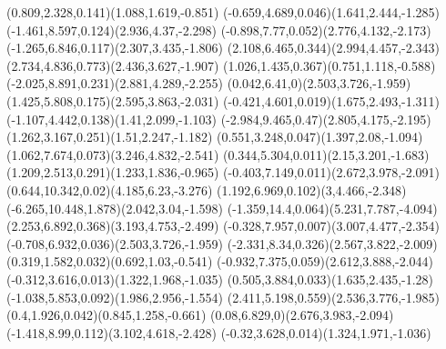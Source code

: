 \pstThreeDLine[linecolor=gray](0.809,2.328,0.141)(1.088,1.619,-0.851)
\pstThreeDLine[linecolor=gray](-0.659,4.689,0.046)(1.641,2.444,-1.285)
\pstThreeDLine[linecolor=gray](-1.461,8.597,0.124)(2.936,4.37,-2.298)
\pstThreeDLine[linecolor=gray](-0.898,7.77,0.052)(2.776,4.132,-2.173)
\pstThreeDLine[linecolor=gray](-1.265,6.846,0.117)(2.307,3.435,-1.806)
\pstThreeDLine[linecolor=gray](2.108,6.465,0.344)(2.994,4.457,-2.343)
\pstThreeDLine[linecolor=gray](2.734,4.836,0.773)(2.436,3.627,-1.907)
\pstThreeDLine[linecolor=gray](1.026,1.435,0.367)(0.751,1.118,-0.588)
\pstThreeDLine[linecolor=gray](-2.025,8.891,0.231)(2.881,4.289,-2.255)
\pstThreeDLine[linecolor=gray](0.042,6.41,0)(2.503,3.726,-1.959)
\pstThreeDLine[linecolor=gray](1.425,5.808,0.175)(2.595,3.863,-2.031)
\pstThreeDLine[linecolor=gray](-0.421,4.601,0.019)(1.675,2.493,-1.311)
\pstThreeDLine[linecolor=gray](-1.107,4.442,0.138)(1.41,2.099,-1.103)
\pstThreeDLine[linecolor=gray](-2.984,9.465,0.47)(2.805,4.175,-2.195)
\pstThreeDLine[linecolor=gray](1.262,3.167,0.251)(1.51,2.247,-1.182)
\pstThreeDLine[linecolor=gray](0.551,3.248,0.047)(1.397,2.08,-1.094)
\pstThreeDLine[linecolor=gray](1.062,7.674,0.073)(3.246,4.832,-2.541)
\pstThreeDLine[linecolor=gray](0.344,5.304,0.011)(2.15,3.201,-1.683)
\pstThreeDLine[linecolor=gray](1.209,2.513,0.291)(1.233,1.836,-0.965)
\pstThreeDLine[linecolor=gray](-0.403,7.149,0.011)(2.672,3.978,-2.091)
\pstThreeDLine[linecolor=gray](0.644,10.342,0.02)(4.185,6.23,-3.276)
\pstThreeDLine[linecolor=gray](1.192,6.969,0.102)(3,4.466,-2.348)
\pstThreeDLine[linecolor=gray](-6.265,10.448,1.878)(2.042,3.04,-1.598)
\pstThreeDLine[linecolor=gray](-1.359,14.4,0.064)(5.231,7.787,-4.094)
\pstThreeDLine[linecolor=gray](2.253,6.892,0.368)(3.193,4.753,-2.499)
\pstThreeDLine[linecolor=gray](-0.328,7.957,0.007)(3.007,4.477,-2.354)
\pstThreeDLine[linecolor=gray](-0.708,6.932,0.036)(2.503,3.726,-1.959)
\pstThreeDLine[linecolor=gray](-2.331,8.34,0.326)(2.567,3.822,-2.009)
\pstThreeDLine[linecolor=gray](0.319,1.582,0.032)(0.692,1.03,-0.541)
\pstThreeDLine[linecolor=gray](-0.932,7.375,0.059)(2.612,3.888,-2.044)
\pstThreeDLine[linecolor=gray](-0.312,3.616,0.013)(1.322,1.968,-1.035)
\pstThreeDLine[linecolor=gray](0.505,3.884,0.033)(1.635,2.435,-1.28)
\pstThreeDLine[linecolor=gray](-1.038,5.853,0.092)(1.986,2.956,-1.554)
\pstThreeDLine[linecolor=gray](2.411,5.198,0.559)(2.536,3.776,-1.985)
\pstThreeDLine[linecolor=gray](0.4,1.926,0.042)(0.845,1.258,-0.661)
\pstThreeDLine[linecolor=gray](0.08,6.829,0)(2.676,3.983,-2.094)
\pstThreeDLine[linecolor=gray](-1.418,8.99,0.112)(3.102,4.618,-2.428)
\pstThreeDLine[linecolor=gray](-0.32,3.628,0.014)(1.324,1.971,-1.036)
